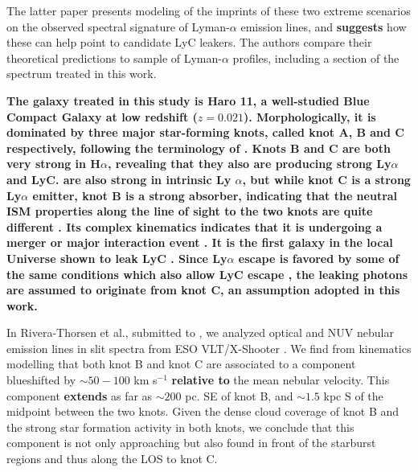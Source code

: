 \documentclass[twocolumn, trackchanges]{aastex61}
\begin{document}

The latter paper presents modeling of
the imprints of these two extreme scenarios on the observed spectral
signature of Lyman-$\alpha$ emission lines, and \textbf{suggests}
how these can help point to candidate LyC leakers. The authors compare their
theoretical predictions to sample of Lyman-$\alpha$ profiles, including
a section of the spectrum treated in this work.

\textbf{The galaxy treated in this study is Haro 11, a well-studied Blue Compact
Galaxy at low redshift ($z = 0.021$). Morphologically, it is dominated by three
major star-forming knots, called knot A, B and C respectively, following the
terminology of \citet{Vader1993} \citep[see also][
and fig.~\ref{fig:apert}]{Kunth1998, Hayes2007}. 
Knots B and C are both very strong in H$\alpha$, revealing that they also are
producing strong Ly$\alpha$ and LyC. are also
strong in intrinsic Ly $\alpha$, but while knot C is a strong Ly$\alpha$
emitter, knot B is a strong absorber, indicating that the neutral ISM 
properties along the line of sight to the two knots are quite different
\citep{Hayes2009,Ostlin2009}.  Its complex kinematics indicates that
it is undergoing a merger or major interaction event 
\citep{Ostlin2001, Ostlin2015, James2014}. It is the first galaxy in the local
Universe shown to leak LyC \citep{Bergvall2006}. Since Ly$\alpha$ escape
is favored by some of the same conditions which also allow LyC escape
\citep[see e.g. ][]{Hayes2015, DijkstraRev}, the
leaking photons are assumed to originate from knot C, an assumption adopted in
this work.}

In Rivera-Thorsen et al., submitted to \apj, we analyzed optical and
NUV nebular emission lines in slit spectra from ESO VLT/X-Shooter
\citep[see also][]{Guseva2012}. We find from kinematics modelling that
both knot B and knot C are associated to a component blueshifted by
$\sim 50 - 100$ km s$^{-1}$ \textbf{relative to} the mean 
nebular velocity.  This component \textbf{extends} as far as $\sim 200$ pc. SE 
of knot B, 
and $\sim 1.5$ kpc S of the midpoint between the two knots. Given the dense
cloud coverage of knot B and the strong star formation activity in both
knots, we conclude that this component is not only approaching but also
found in front of the starburst regions and thus along the LOS to knot
C.
\end{document}
